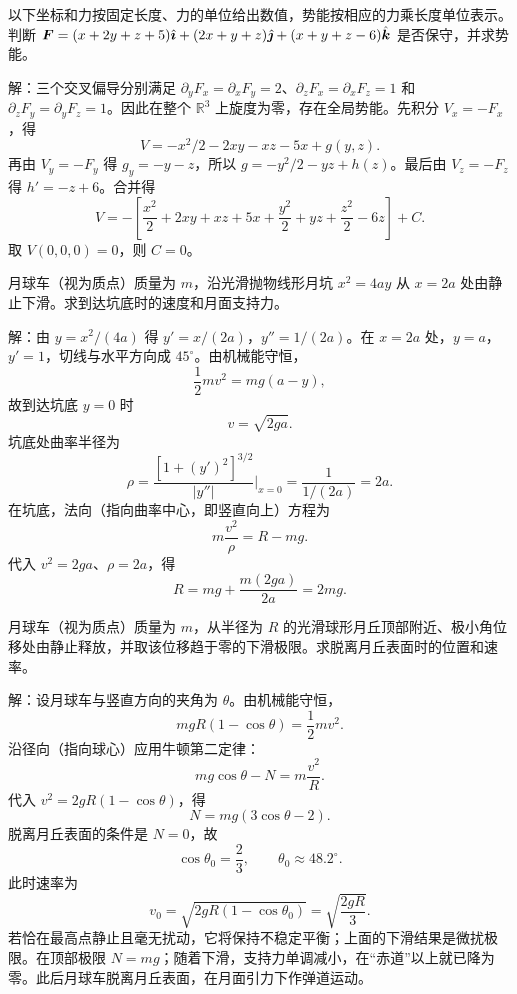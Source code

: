 \begin{example}[保守力场的势能]
以下坐标和力按固定长度、力的单位给出数值，势能按相应的力乘长度单位表示。判断 $\boldsymbol{F}=(x+2y+z+5)\hat{\boldsymbol{\imath}}+(2x+y+z)\hat{\boldsymbol{\jmath}}+(x+y+z-6)\hat{\boldsymbol{k}}$ 是否保守，并求势能。

解：三个交叉偏导分别满足 $\partial_yF_x=\partial_xF_y=2$、$\partial_zF_x=\partial_xF_z=1$ 和 $\partial_zF_y=\partial_yF_z=1$。因此在整个 $\mathbb R^3$ 上旋度为零，存在全局势能。先积分 $V_x=-F_x$，得
\[
V=-x^2/2-2xy-xz-5x+g(y,z).
\]
再由 $V_y=-F_y$ 得 $g_y=-y-z$，所以 $g=-y^2/2-yz+h(z)$。最后由 $V_z=-F_z$ 得 $h'=-z+6$。合并得
\[
V=-\left[\frac{x^2}{2}+2xy+xz+5x+\frac{y^2}{2}+yz+\frac{z^2}{2}-6z\right]+C.
\]
取 $V(0,0,0)=0$，则 $C=0$。
\end{example}

\begin{example}[月球车沿抛物线月坑下滑]
月球车（视为质点）质量为 $m$，沿光滑抛物线形月坑 $x^2=4ay$ 从 $x=2a$ 处由静止下滑。求到达坑底时的速度和月面支持力。

解：由 $y=x^2/(4a)$ 得 $y'=x/(2a)$，$y''=1/(2a)$。在 $x=2a$ 处，$y=a$，$y'=1$，切线与水平方向成 $45^\circ$。由机械能守恒，
\[
\frac12mv^2=mg(a-y),
\]
故到达坑底 $y=0$ 时
\[
v=\sqrt{2ga}.
\]
坑底处曲率半径为
\[
\rho=\frac{[1+(y')^2]^{3/2}}{|y''|}\bigg|_{x=0}
=\frac{1}{1/(2a)}=2a.
\]
在坑底，法向（指向曲率中心，即竖直向上）方程为
\[
m\frac{v^2}{\rho}=R-mg.
\]
代入 $v^2=2ga$、$\rho=2a$，得
\[
R=mg+\frac{m(2ga)}{2a}=2mg.
\]
\end{example}
\begin{example}[月球车翻越球形月丘]
月球车（视为质点）质量为 $m$，从半径为 $R$ 的光滑球形月丘顶部附近、极小角位移处由静止释放，并取该位移趋于零的下滑极限。求脱离月丘表面时的位置和速率。

\begin{center}
\end{center}

解：设月球车与竖直方向的夹角为 $\theta$。由机械能守恒，
\[
mgR(1-\cos\theta)=\frac12mv^2 .
\]
沿径向（指向球心）应用牛顿第二定律：
\[
mg\cos\theta-N=m\frac{v^2}{R}.
\]
代入 $v^2=2gR(1-\cos\theta)$，得
\[
N=mg(3\cos\theta-2).
\]
脱离月丘表面的条件是 $N=0$，故
\[
\cos\theta_0=\frac23,\qquad
\theta_0\approx48.2^\circ .
\]
此时速率为
\[
v_0=\sqrt{2gR(1-\cos\theta_0)}
=\sqrt{\frac{2gR}{3}} .
\]
若恰在最高点静止且毫无扰动，它将保持不稳定平衡；上面的下滑结果是微扰极限。在顶部极限 $N=mg$；随着下滑，支持力单调减小，在“赤道”以上就已降为零。此后月球车脱离月丘表面，在月面引力下作弹道运动。
\end{example}


